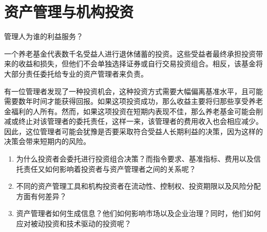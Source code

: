 \chapter{资产管理与机构投资}
\label{chap:Asset_Management_and_Institutional_Investment}

\begin{openingcase}{管理人为谁的利益服务？}

一个养老基金代表数千名受益人进行退休储蓄的投资。这些受益者最终承担投资带来的收益和损失，但他们不会单独选择证券或自行交易投资组合。相反，该基金将大部分责任委托给专业的资产管理者来负责。

有一位管理者发现了一种投资机会，这种投资方式需要大幅偏离基准水平，且可能需要数年时间才能获得回报。如果这项投资成功，那么收益主要将归那些享受养老金福利的人所有。然而，如果这项投资在短期内表现不佳，那么养老基金可能会削减或终止对该管理者的委托责任，这样一来，该管理者的费用收入也会相应减少。因此，这位管理者可能会犹豫是否要采取符合受益人长期利益的决策，因为这样的决策会带来短期内的风险。

\end{openingcase}


\begin{tcolorbox}[
  enhanced,
  colback=FinanceBlue!6,
  colframe=FinanceBlue,
  boxrule=0.6pt,
  sharp corners,
  left=8pt,
  right=8pt,
  top=7pt,
  bottom=7pt,
  before skip=1em,
  after skip=1.6em,
  title=\textbf{核心问题},
  coltitle=white,
  colbacktitle=FinanceBlue,
  fonttitle=\bfseries,
  attach boxed title to top left={xshift=6pt,yshift=-2mm},
  boxed title style={
    boxrule=0pt,
    sharp corners,
    left=5pt,
    right=5pt,
    top=2pt,
    bottom=2pt
  }
]
\begin{enumerate}[
  leftmargin=*,
  label=\textcolor{FinanceBlue}{\textbf{\arabic*.}},
  itemsep=0.55em,
  topsep=0.2em
]


\item 为什么投资者会委托进行投资组合决策？而指令要求、基准指标、费用以及信托责任又如何影响着投资者与资产管理者之间的关系呢？

\item 不同的资产管理工具和机构投资者在流动性、控制权、投资期限以及风险分配方面有何差异？

\item 资产管理者如何生成信息？他们如何影响市场以及企业治理？同时，他们如何应对被动投资和技术驱动的投资呢？


\end{enumerate}
\end{tcolorbox}

